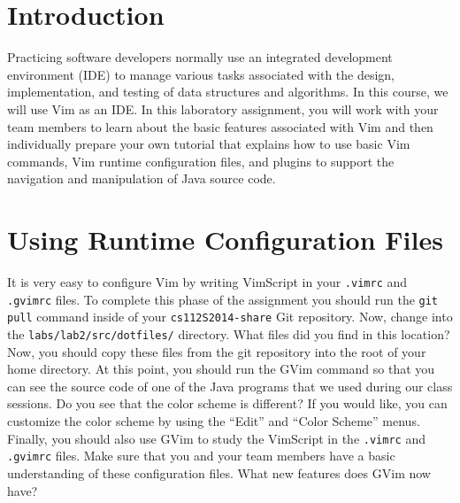 


\usepackage[compact]{titlesec}



\section*{Introduction}

Practicing software developers normally use an integrated development environment (IDE) to manage various tasks associated with
the design, implementation, and testing of data structures and algorithms. In this course, we will use Vim as an IDE.  In this
laboratory assignment, you will work with your team members to learn about the basic features associated with Vim and then
individually prepare your own tutorial that explains how to use basic Vim commands, Vim runtime configuration files, and plugins
to support the navigation and manipulation of Java source code. 

\section*{Using Runtime Configuration Files}

It is very easy to configure Vim by writing VimScript in your {\tt .vimrc} and {\tt .gvimrc} files.  To complete this phase of the
assignment you should run the {\tt git pull} command inside of your {\tt cs112S2014-share} Git repository.  Now, change into the
{\tt labs/lab2/src/dotfiles/} directory.  What files did you find in this location? Now, you should copy these files from the git
repository into the root of your home directory. At this point, you should run the GVim command so that you can see the source
code of one of the Java programs that we used during our class sessions. Do you see that the color scheme is different? If you
would like, you can customize the color scheme by using the ``Edit'' and ``Color Scheme'' menus.  Finally, you should also use
GVim to study the VimScript in the {\tt .vimrc} and {\tt .gvimrc} files.  Make sure that you and your team members have a basic
understanding of these configuration files. What new features does GVim now have?


